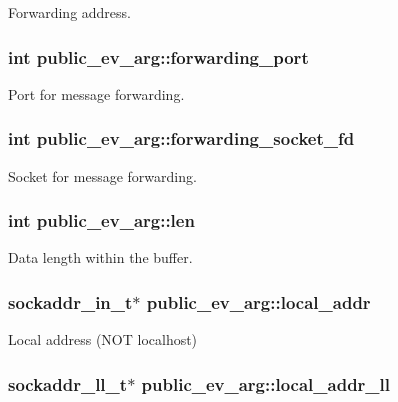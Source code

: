 \-Forwarding address. \hypertarget{structpublic__ev__arg_aaeeedc8ecdd9a155ea8b3036a85754fd}{
\subsubsection[{forwarding\-\_\-port}]{\setlength{\rightskip}{0pt plus 5cm}int {\bf public\-\_\-ev\-\_\-arg\-::forwarding\-\_\-port}}}\label{structpublic__ev__arg_aaeeedc8ecdd9a155ea8b3036a85754fd}
\-Port for message forwarding. \hypertarget{structpublic__ev__arg_a152a3bdb23a5a71eaa0ca962ff966527}{
\subsubsection[{forwarding\-\_\-socket\-\_\-fd}]{\setlength{\rightskip}{0pt plus 5cm}int {\bf public\-\_\-ev\-\_\-arg\-::forwarding\-\_\-socket\-\_\-fd}}}\label{structpublic__ev__arg_a152a3bdb23a5a71eaa0ca962ff966527}
\-Socket for message forwarding. \hypertarget{structpublic__ev__arg_a53c7bdba35e8c9cdb0cc7d0e1c5f9d20}{
\subsubsection[{len}]{\setlength{\rightskip}{0pt plus 5cm}int {\bf public\-\_\-ev\-\_\-arg\-::len}}}\label{structpublic__ev__arg_a53c7bdba35e8c9cdb0cc7d0e1c5f9d20}
\-Data length within the buffer. \hypertarget{structpublic__ev__arg_ac375febf0d00c25f18262257963d0b4a}{
\subsubsection[{local\-\_\-addr}]{\setlength{\rightskip}{0pt plus 5cm}sockaddr\-\_\-in\-\_\-t$\ast$ {\bf public\-\_\-ev\-\_\-arg\-::local\-\_\-addr}}}\label{structpublic__ev__arg_ac375febf0d00c25f18262257963d0b4a}
\-Local address (\-N\-O\-T localhost) \hypertarget{structpublic__ev__arg_a2f32a405cea10994470b8095471b8133}{
\subsubsection[{local\-\_\-addr\-\_\-ll}]{\setlength{\rightskip}{0pt plus 5cm}sockaddr\-\_\-ll\-\_\-t$\ast$ {\bf public\-\_\-ev\-\_\-arg\-::local\-\_\-addr\-\_\-ll}}}\label{structpublic__ev__arg_a2f32a405cea10994470b8095471b8133}
